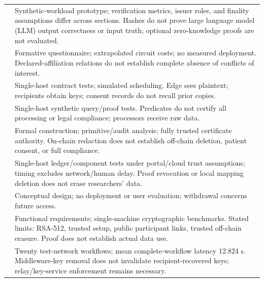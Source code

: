 \begin{longtable}{@{}>{\raggedright\arraybackslash}m{}>{\raggedright\arraybackslash}m{}@{}}
\addlinespace[5pt]
\cite{updateFerreira2026SportsConsent} & Synthetic-workload prototype; verification metrics, issuer roles, and finality assumptions differ across sections. Hashes do not prove large language model (LLM) output correctness or input truth; optional zero-knowledge proofs are not evaluated. \\
\addlinespace[5pt]
\cite{updateAlSabahi2026AuthorshipConsent} & Formative questionnaire; extrapolated circuit costs; no measured deployment. Declared-affiliation relations do not establish complete absence of conflicts of interest. \\
\addlinespace[5pt]
\cite{updateCh2026ConsentOffloading} & Single-host contract tests; simulated scheduling. Edge sees plaintext; recipients obtain keys; consent records do not recall prior copies. \\
\addlinespace[5pt]
\cite{updateGupta2026ScalableConsent} & Single-host synthetic query/proof tests. Predicates do not certify all processing or legal compliance; processors receive raw data. \\
\addlinespace[5pt]
\cite{updateMiao2026PermissionSupervision} & Formal construction; primitive/audit analysis; fully trusted certificate authority. On-chain redaction does not establish off-chain deletion, patient consent, or full compliance. \\
\addlinespace[5pt]
\cite{updateNaghmouchi2026ClinConNet} & Single-host ledger/component tests under portal/cloud trust assumptions; timing excludes network/human delay. Proof revocation or local mapping deletion does not erase researchers' data. \\
\addlinespace[5pt]
\cite{updatePhuyal2026Architecture} & Conceptual design; no deployment or user evaluation; withdrawal concerns future access. \\
\addlinespace[5pt]
\cite{updateScaramuzza2026ZKConsent} & Functional requirements; single-machine cryptographic benchmarks. Stated limits: RSA-512, trusted setup, public participant links, trusted off-chain erasure. Proof does not establish actual data use. \\
\addlinespace[5pt]
\cite{updateHemlata2026DualCare} & Twenty test-network workflows; mean complete-workflow latency 12.824 s. Middleware-key removal does not invalidate recipient-recovered keys; relay/key-service enforcement remains necessary. \\
\end{longtable}

